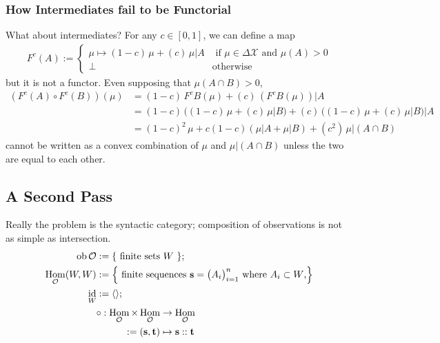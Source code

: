 \documentclass{article}
\DeclareMathOperator{\ob}{\mathrm{ob}}
\DeclareMathOperator{\id}{id}
\DeclareMathOperator{\Hom}{\mathrm{Hom}}
\newcommand\X{\mathcal{X}}
\newcommand\A{\mathcal{A}}
\newcommand\Ob{\mathcal{O}}
\theoremstyle{plain}
\theoremstyle{definition}
\begin{document}
    \subsubsection*{How Intermediates fail to be Functorial}
    What about intermediates?  For any $c \in [0,1]$, we can define a map
    \begin{align*}
        F^c(A
        ) := 
            \begin{cases}
                \mu \mapsto  (1-c)\, \mu + (c)\, \mu| A & \text{ if } \mu  \in \Delta\X \text{ and }\mu(A) > 0 \\
                \bot &\text{otherwise}                
        \end{cases}
    \end{align*}
    but it is not a functor. Even supposing that $\mu(A \cap B) > 0$, 
    \begin{align*}
        (F^c(A) \circ F^c(B))(\mu) 
            &= (1-c)\, F^c B(\mu) + (c)\,(F^c B(\mu))|A \\
            &= (1-c)\, \Big( (1-c)\, \mu + (c)\, \mu| B \Big) + (c)\, 
                \Big((1-c)\, \mu + (c)\, \mu| B\Big)|A \\
            &= (1-c)^2\,\mu + c(1-c) (\mu|A + \mu|B) + (c^2)\, \mu|(A \cap B)
    \end{align*}
    cannot be written as a convex combination of $\mu$ and $\mu|(A\cap B)$ unless the two are equal to each other. 
    
    \subsection{A Second Pass}
    Really the problem is the syntactic category; composition of observations is not as simple as intersection. 
    \begin{align*}
        \ob \Ob &:=  \{\text{ finite sets } W~\}; \\
        \Hom_{\Ob}(W,W) &:= 
            \Big\{ \text{ finite sequences $\mathbf s =
             \big( A_i \big)_{i=1}^n$ where $A_i \subset W$,} \Big\} \\
        \id_{W} &:= \langle\rangle; \\
        &\begin{aligned}
        \circ : \Hom_{\Ob} \times \Hom_{\Ob} &\to \Hom_{\Ob} \\
            := ({\bf s, t}) &\mapsto {\bf s :: t}
        \end{aligned}
    \end{align*}
    
\end{document}
